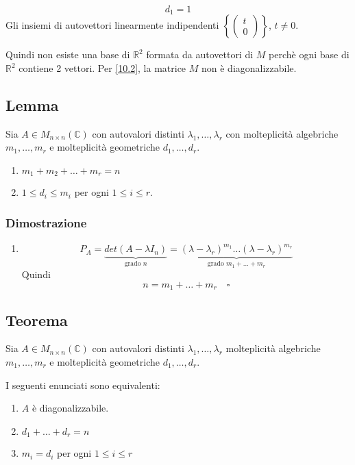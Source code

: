 \documentclass[a4paper]{article}
\theoremstyle{break}
\theoremstyle{break}
\theoremstyle{break}
\theoremstyle{break}
\begin{document}
\begin{example}
  \[
  d_1 = 1
  \] 
  Gli insiemi di autovettori linearmente indipendenti \( \left\{ \begin{pmatrix} t\\0 \end{pmatrix}  \right\} \),
  \( t \neq 0 \).

  \vspace{1em}
  \noindent Quindi non esiste una base di \( \mathbb{R}^2 \) formata da autovettori di \( M \) 
  perchè ogni base di \( \mathbb{R}^2 \) contiene 2 vettori. Per \ref{10.2}, la matrice
  \( M \) non è diagonalizzabile.
\end{example}

\subsection{Lemma}
\label{10.5}
Sia \( A \in M_{n \times n}(\mathbb{C}) \) con autovalori distinti \( \lambda_1, \ldots, \lambda_r \)
con molteplicità algebriche \( m_1, \ldots, m_r \) e molteplicità geometriche \( d_1, \ldots, d_r \).
\begin{enumerate}
  \item \( m_1 + m_2 + \ldots + m_r = n \) 
  \item \( 1 \le d_i \le m_i \) per ogni \( 1 \le i \le r \).
\end{enumerate}

\subsubsection{Dimostrazione}
\begin{enumerate}
  \item \[
      P_A = \underbrace{det(A - \lambda I_n)}_{\text{grado }n} = \underbrace{(\lambda - \lambda_r)^{m_1} \ldots (\lambda - \lambda_r)^{m_r}}_{\text{grado }m_1 + \ldots + m_r}
    \]
    Quindi
    \[
    n = m_1 + \ldots + m_r \quad \square
    \] 
\end{enumerate}

\subsection{Teorema}
Sia \( A \in M_{n \times n}(\mathbb{C}) \) con autovalori distinti \( \lambda_1, \ldots, \lambda_r \) 
molteplicità algebriche \( m_1, \ldots, m_r \) e molteplicità geometriche \( d_1, \ldots, d_r \).

\noindent I seguenti enunciati sono equivalenti:
\begin{enumerate}
  \item \( A \) è diagonalizzabile.
  \item \( d_1 + \ldots + d_r = n \)
  \item \( m_i = d_i \) per ogni \( 1 \le i \le r \)
\end{enumerate}
\end{document}

